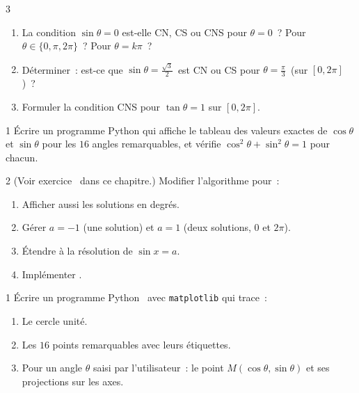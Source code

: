 \begin{bilan}
\begin{exo}{3}
\begin{enumerate}
  \item La condition $\sin\theta=0$ est-elle CN, CS ou CNS pour $\theta=0$~?
        Pour $\theta\in\{0,\pi,2\pi\}$~? Pour $\theta=k\pi$~?
  \item D\'eterminer~: est-ce que \og $\sin\theta=\frac{\sqrt{3}}{2}$\fg\ est CN ou CS
        pour \og $\theta=\frac{\pi}{3}$\fg\ (sur $[0,2\pi]$)~?
  \item Formuler la condition CNS pour $\tan\theta=1$ sur $[0,2\pi]$.
\end{enumerate}
\end{exo}

\begin{exo}{1}
\'Ecrire un programme Python qui affiche le tableau des valeurs exactes
de $\cos\theta$ et $\sin\theta$ pour les $16$ angles remarquables,
et v\'erifie $\cos^2\theta+\sin^2\theta=1$ pour chacun.
\end{exo}

\begin{exo}[\algo\ Algorithme~: r\'esoudre $\cos x=a$ sur {$[0,2\pi]$} \corrige]{2}
(Voir exercice \logicoalgo\ dans ce chapitre.)
Modifier l'algorithme pour~:
\begin{enumerate}
  \item Afficher aussi les solutions en degr\'es.
  \item G\'erer $a=-1$ (une solution) et $a=1$ (deux solutions, $0$ et $2\pi$).
  \item \'Etendre \`a la r\'esolution de $\sin x=a$.
  \item Impl\'ementer \computer.
\end{enumerate}
\end{exo}

\begin{exo}{1}
\'Ecrire un programme Python \computer\ avec \texttt{matplotlib} qui trace~:
\begin{enumerate}
  \item Le cercle unit\'e.
  \item Les $16$ points remarquables avec leurs \'etiquettes.
  \item Pour un angle $\theta$ saisi par l'utilisateur~:
        le point $M(\cos\theta,\sin\theta)$ et ses projections sur les axes.
\end{enumerate}
\end{exo}


\end{bilan}
